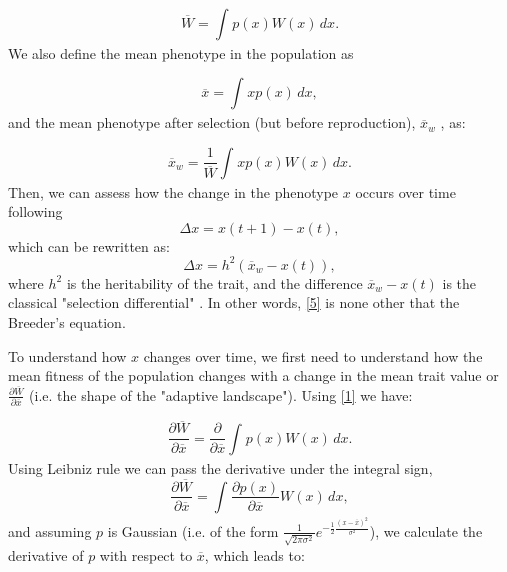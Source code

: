 \documentclass{revtex4}
\begin{document}
\begin{equation}\label{1}
\overline{W}=\int_{} p(x)W(x)\,dx.
\end{equation}
We also define the mean phenotype in the population as  

\begin{equation}\label{2}
\overline{x}=\int_{} xp(x)\,dx,
\end{equation}
and the mean phenotype after selection (but before reproduction), $\overline{x}_{w}$ \cite{Falconer:1967tg}, as:

\begin{equation}\label{3}
\overline{x}_{w}=\frac{1}{\overline{W}}\int_{} xp(x)W(x)\,dx.
\end{equation}
Then, we can assess how the change in the phenotype $x$ occurs over time following
\begin{equation}\label{4}
\Delta x=x(t+1)-x(t),
\end{equation}
which can be rewritten as:
\begin{equation}\label{5}
\Delta x=h^{2}(\overline{x}_{w}-x(t)),
\end{equation}
where $h^{2}$ is the heritability of the trait, and the difference $\overline{x}_{w}-x(t)$ is the classical "selection differential"  \cite{Falconer:1967tg,Lande:1976ga}. In other words, \ref{5} is none other that the Breeder's equation. 

To understand how $x$ changes over time, we first need to understand how the mean fitness of the population changes with a change in the mean trait value or $\frac{\partial \overline{W}}{\partial \overline{x}}$ (i.e. the shape of the "adaptive landscape"). Using \ref{1} we have:

\begin{equation}\label{6}
\frac{\partial \overline{W}}{\partial \overline{x}}=\frac{\partial}{\partial \overline{x}}\int_{} p(x)W(x)\,dx.
\end{equation}
Using Leibniz rule we can pass the derivative under the integral sign, 
\begin{equation}\label{7}
\frac{\partial \overline{W}}{\partial \overline{x}}=\int_{} \frac{\partial p(x)}{\partial \overline{x}}W(x)\,dx,
\end{equation}
and assuming $p$ is Gaussian (i.e. of the form $\frac{1}{\sqrt{2 \pi \sigma^{2}}} e^{-\frac{1}{2}\frac{(x-\overline{x})^{2}}{\sigma^{2}}} $), we calculate the derivative of $p$ with respect to $\overline{x}$, which leads to:
\end{document}
